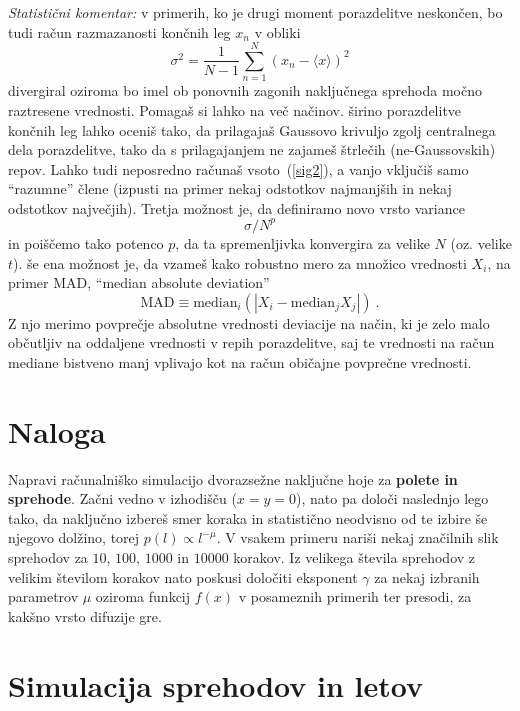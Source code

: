 \documentclass[slovene,11pt,a4paper]{article}
\begin{document}
{\sl Statistični komentar:} v primerih, ko je drugi
moment porazdelitve neskončen, bo tudi račun razmazanosti
končnih leg $x_n$ v obliki
\begin{equation}
\sigma^2 = \frac{1}{N-1} \sum_{n=1}^N \left( x_n - \langle x \rangle \right)^2
\label{sig2}
\end{equation}
divergiral oziroma bo imel ob ponovnih zagonih naključnega sprehoda
močno raztresene vrednosti.  Pomagaš si lahko na več načinov.
širino porazdelitve končnih leg lahko oceniš tako, da prilagajaš
Gaussovo krivuljo zgolj centralnega dela porazdelitve, tako da
s prilagajanjem ne zajameš štrlečih (ne-Gaussovskih) repov.
Lahko tudi neposredno računaš vsoto~(\ref{sig2}), a vanjo
vključiš samo ``razumne'' člene (izpusti na primer nekaj
odstotkov najmanjših in nekaj odstotkov največjih).
Tretja možnost je, da definiramo novo vrsto variance
\begin{equation*}
  \sigma / N^p
\end{equation*}
in poiščemo tako potenco $p$, da ta spremenljivka konvergira
za velike $N$ (oz. velike $t$).  še ena možnost je, da vzameš
kako robustno mero za množico vrednosti $X_i$, na primer MAD,
``median absolute deviation''
\begin{equation*}
  \mathrm{MAD} \equiv \mathrm{median}_i\left( | X_i - \mathrm{median}_j X_j | \right) \>.
\end{equation*}
Z njo merimo povprečje absolutne vrednosti deviacije na način,
ki je zelo malo občutljiv na oddaljene vrednosti v repih porazdelitve,
saj te vrednosti na račun mediane bistveno manj vplivajo kot na
račun običajne povprečne vrednosti.

\section{Naloga}

Napravi računalniško simulacijo
dvorazsežne naključne hoje za \textbf{polete in sprehode}.  Začni vedno v izhodišču
($x=y=0$), nato pa določi naslednjo lego tako, da naključno
izbereš smer koraka in statistično neodvisno od te izbire
še njegovo dolžino, torej $p(l) \propto l^{-\mu}$. V vsakem primeru nariši nekaj značilnih
slik sprehodov za $10$, $100$, $1000$ in $10000$ korakov.
Iz velikega števila sprehodov z velikim številom korakov
nato poskusi določiti eksponent $\gamma$ za nekaj izbranih
parametrov $\mu$ oziroma funkcij $f(x)$ v posameznih primerih
ter presodi, za kakšno vrsto difuzije gre.

\section{Simulacija sprehodov in letov}
\end{document}
